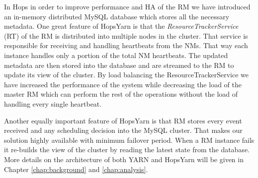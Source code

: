 In Hops in order to improve performance and HA of the RM we have introduced an
in-memory distributed MySQL database which stores all the necessary
metadata. One great feature of HopsYarn is that the
\emph{ResourceTrackerService} (RT) of the RM is distributed into multiple
nodes in the cluster. That service is responsible for receiving and handling
heartbeats from the NMs. That way each instance handles only a portion of the total NM
heartbeats. The updated metadata are then stored into the database and
are streamed to the RM to update its view of the cluster. By load
balancing the ResourceTrackerService we have increased the performance
of the system while decreasing the load of the master RM which can
perform the rest of the operations without the load of handling every
single heartbeat.

Another equally important feature of HopsYarn is that RM stores
every event received and any scheduling decision into the MySQL
cluster. That makes our solution highly available with minimum
failover period. When a RM instance fails it re-builds the view of the
cluster by reading the latest state from the database. More details on
the architecture of both YARN and HopsYarn will be given in Chapter
\ref{chap:background} and \ref{chap:analysis}.